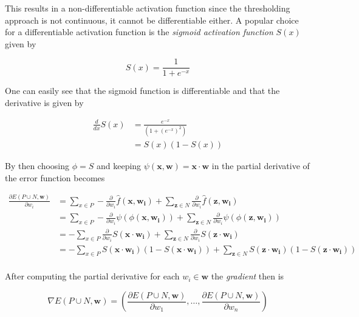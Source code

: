 This results in a non-differentiable activation function since the thresholding approach is not continuous, it cannot be differentiable either.
A popular choice for a differentiable activation function is the \textit{sigmoid activation function} $S(x)$ given by

\begin{equation}
    S(x) = \frac{1}{1 + e^{-x}}
\end{equation}

One can easily see that the sigmoid function is differentiable and that the derivative is given by 

\begin{equation}
    \begin{split}
        \frac{d}{dx} S(x) 
        &= \frac{e^{-x}}{(1 + (e^{-x})^2)} \\
        &= S(x)(1 - S(x)) 
    \end{split}
\end{equation}

By then choosing $\phi = S$ and keeping $\psi(\bm{x}, \bm{w}) = \bm{x} \cdot \bm{w}$ in  the partial derivative of the error function becomes

\begin{equation}
    \label{eq:error-derivative-2}
    \begin{split}
        \frac{\partial E(P \cup N, \bm{w})}{\partial w_i}
        &= \sum_{x \in P} - \frac{\partial }{\partial w_i} \hat{f}(\bm{x},\bm{w_i}) + \sum_{\bm{z} \in N} \frac{\partial }{\partial w_i} \hat{f}(\bm{z},\bm{w_i})  \\
        &=  \sum_{x \in P} - \frac{\partial }{\partial w_i} \psi(\phi(\bm{x},\bm{w_i})) + \sum_{\bm{z} \in N} \frac{\partial }{\partial w_i} \psi(\phi(\bm{z},\bm{w_i})) \\
        &=  - \sum_{x \in P} \frac{\partial }{\partial w_i} S(\bm{x} \cdot \bm{w_i}) + \sum_{\bm{z} \in N} \frac{\partial }{\partial w_i} S(\bm{z} \cdot \bm{w_i}) \\
        &=  - \sum_{x \in P}  S(\bm{x} \cdot \bm{w_i}) (1 - S(\bm{x} \cdot \bm{w_i})) + \sum_{\bm{z} \in N} S(\bm{z} \cdot \bm{w_i}) (1 - S(\bm{z} \cdot \bm{w_i}))\\
    \end{split}
\end{equation}

After computing the partial derivative for each $w_i \in \bm{w}$ the \textit{gradient} then is 

\begin{equation}
    \nabla E(P \cup N, \bm{w}) = \left(\frac{\partial E(P \cup N, \bm{w})}{\partial w_1}, \dots, \frac{\partial E(P \cup N, \bm{w})}{\partial w_n} \right)
\end{equation}

